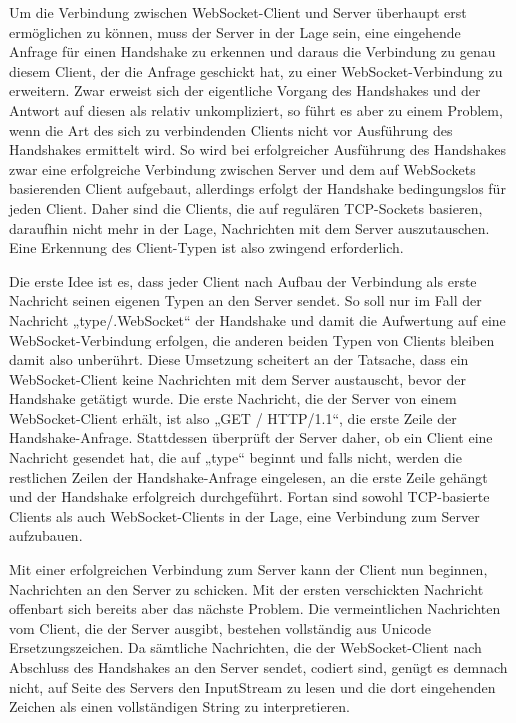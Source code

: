 \documentclass[12pt, onecolumn, notitlepage]{scrartcl}
\begin{document}
Um die Verbindung zwischen WebSocket-Client und Server überhaupt erst ermöglichen zu können, muss der Server in der Lage sein, eine eingehende Anfrage für einen Handshake zu erkennen und daraus die Verbindung zu genau diesem Client, der die Anfrage geschickt hat, zu einer WebSocket-Verbindung zu erweitern. Zwar erweist sich der eigentliche Vorgang des Handshakes und der Antwort auf diesen als relativ unkompliziert, so führt es aber zu einem Problem, wenn die Art des sich zu verbindenden Clients nicht vor Ausführung des Handshakes ermittelt wird. So wird bei erfolgreicher Ausführung des Handshakes zwar eine erfolgreiche Verbindung zwischen Server und dem auf WebSockets basierenden Client aufgebaut, allerdings erfolgt der Handshake bedingungslos für jeden Client. Daher sind die Clients, die auf regulären TCP-Sockets basieren, daraufhin nicht mehr in der Lage, Nachrichten mit dem Server auszutauschen. Eine Erkennung des Client-Typen ist also zwingend erforderlich. \par

Die erste Idee ist es, dass jeder Client nach Aufbau der Verbindung als erste Nachricht seinen eigenen Typen an den Server sendet. So soll nur im Fall der Nachricht „type/.WebSocket“ der Handshake und damit die Aufwertung auf eine WebSocket-Verbindung erfolgen, die anderen beiden Typen von Clients bleiben damit also unberührt. Diese Umsetzung scheitert an der Tatsache, dass ein WebSocket-Client keine Nachrichten mit dem Server austauscht, bevor der Handshake getätigt wurde. Die erste Nachricht, die der Server von einem WebSocket-Client erhält, ist also „GET / HTTP/1.1“, die erste Zeile der Handshake-Anfrage. Stattdessen überprüft der Server daher, ob ein Client eine Nachricht gesendet hat, die auf „type“ beginnt und falls nicht, werden die restlichen Zeilen der Handshake-Anfrage eingelesen,  an die erste Zeile gehängt und der Handshake erfolgreich durchgeführt. Fortan sind sowohl TCP-basierte Clients als auch WebSocket-Clients in der Lage, eine Verbindung zum Server aufzubauen. \par

Mit einer erfolgreichen Verbindung zum Server kann der Client nun beginnen, Nachrichten an den Server zu schicken. Mit der ersten verschickten Nachricht offenbart sich bereits aber das nächste Problem. Die vermeintlichen Nachrichten vom Client, die der Server ausgibt, bestehen vollständig aus Unicode Ersetzungszeichen. Da sämtliche Nachrichten, die der WebSocket-Client nach Abschluss des Handshakes an den Server sendet, codiert sind, genügt es demnach nicht, auf Seite des Servers den InputStream zu lesen und die dort eingehenden Zeichen als einen vollständigen String zu interpretieren. \par
\end{document}
